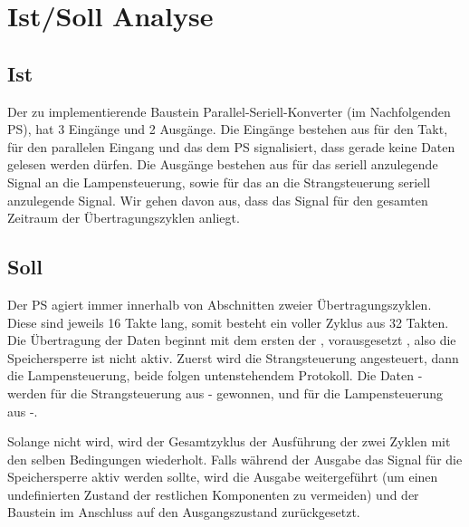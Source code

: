 \documentclass{article}
\begin{document}
\section{Ist/Soll Analyse}
  \subsection{Ist}
    Der zu implementierende Baustein Parallel-Seriell-Konverter (im Nachfolgenden PS), hat 3 Eingänge und 2 Ausgänge. Die Eingänge bestehen aus  für den Takt,  für den parallelen Eingang und  das dem PS signalisiert, dass gerade keine Daten gelesen werden dürfen.
    Die Ausgänge bestehen aus  für das seriell anzulegende Signal an die Lampensteuerung, sowie  für das an die Strangsteuerung seriell anzulegende Signal.
    Wir gehen davon aus, dass das Signal  für den gesamten Zeitraum der Übertragungszyklen anliegt.

  \subsection{Soll}
    Der PS agiert immer innerhalb von Abschnitten zweier Übertragungszyklen. Diese sind jeweils 16 Takte lang, somit besteht ein voller Zyklus aus 32 Takten.
    Die Übertragung der Daten beginnt mit dem ersten  der , vorausgesetzt , also die Speichersperre ist nicht aktiv.
    Zuerst wird die Strangsteuerung angesteuert, dann die Lampensteuerung, beide folgen untenstehendem Protokoll.
    Die Daten - werden für die Strangsteuerung aus - gewonnen, und für die Lampensteuerung aus -.

    Solange  nicht  wird, wird der Gesamtzyklus der Ausführung der zwei Zyklen mit den selben Bedingungen wiederholt.
    Falls während der Ausgabe das Signal  für die Speichersperre aktiv werden sollte, wird die Ausgabe weitergeführt (um einen undefinierten Zustand der restlichen Komponenten zu vermeiden) und der Baustein im Anschluss auf den Ausgangszustand zurückgesetzt.
\end{document}
